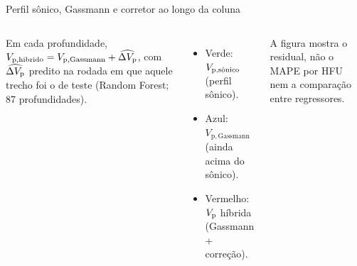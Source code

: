 \documentclass[aspectratio=169,10pt]{beamer}
\begin{document}
\begin{frame}{Perfil sônico, Gassmann e corretor ao longo da coluna}
  \begin{columns}[T,onlytextwidth]
    \footnotesize
    Em cada profundidade,
    $V_{\mathrm{p,hibrido}} = V_{\mathrm{p,Gassmann}} + \widehat{\dVp}$,
    com $\widehat{\dVp}$ predito na rodada em que aquele trecho foi o
    de teste (Random Forest; 87 profundidades).
    \vspace{0.08cm}
    \begin{itemize}
      \item Verde: $\Vpsonsub$ (perfil sônico).
      \item Azul: $V_{\mathrm{p,Gassmann}}$ (ainda acima do sônico).
      \item Vermelho: $\Vp$ híbrida (Gassmann + correção).
    \end{itemize}
    \vspace{0.08cm}
    {\scriptsize A figura mostra o residual, não o MAPE por HFU nem a
    comparação entre regressores.}
  \end{columns}
\end{frame}
\end{document}
